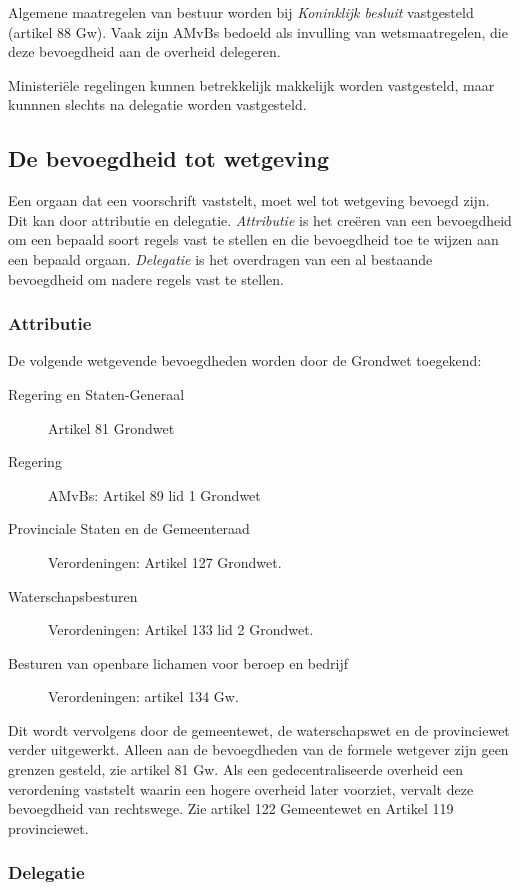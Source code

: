 \documentclass{article}
\begin{document}
Algemene maatregelen van bestuur worden bij \emph{Koninklijk besluit}
vastgesteld (artikel 88 Gw). Vaak zijn AMvBs bedoeld als invulling van
wetsmaatregelen, die deze bevoegdheid aan de overheid delegeren.

Ministeriële regelingen kunnen betrekkelijk makkelijk worden vastgesteld, maar
kunnnen slechts na delegatie worden vastgesteld.


\subsection{De bevoegdheid tot wetgeving}

Een orgaan dat een voorschrift vaststelt, moet wel tot wetgeving bevoegd
zijn. Dit kan door attributie en delegatie. \emph{Attributie} is het
creëren van een bevoegdheid om een bepaald soort regels vast te stellen
en die bevoegdheid toe te wijzen aan een bepaald orgaan. \emph{Delegatie}
is het overdragen van een al bestaande bevoegdheid om nadere regels vast
te stellen.

\subsubsection{Attributie}

De volgende wetgevende bevoegdheden worden door de Grondwet toegekend:

\begin{description}
  \item[Regering en Staten-Generaal] Artikel 81 Grondwet
  \item[Regering] AMvBs: Artikel 89 lid 1 Grondwet
  \item[Provinciale Staten en de Gemeenteraad] Verordeningen: Artikel 127 Grondwet.
  \item[Waterschapsbesturen] Verordeningen: Artikel 133 lid 2 Grondwet.
  \item[Besturen van openbare lichamen voor beroep en bedrijf]Verordeningen:
    artikel 134 Gw.
\end{description}

Dit wordt vervolgens door de gemeentewet, de waterschapswet en de provinciewet
verder uitgewerkt. Alleen aan de bevoegdheden van de formele wetgever zijn geen
grenzen gesteld, zie artikel 81 Gw. Als een gedecentraliseerde overheid een
verordening vaststelt waarin een hogere overheid later voorziet, vervalt deze
bevoegdheid van rechtswege. Zie artikel 122 Gemeentewet en Artikel 119
provinciewet.

\subsubsection{Delegatie}
\end{document}
